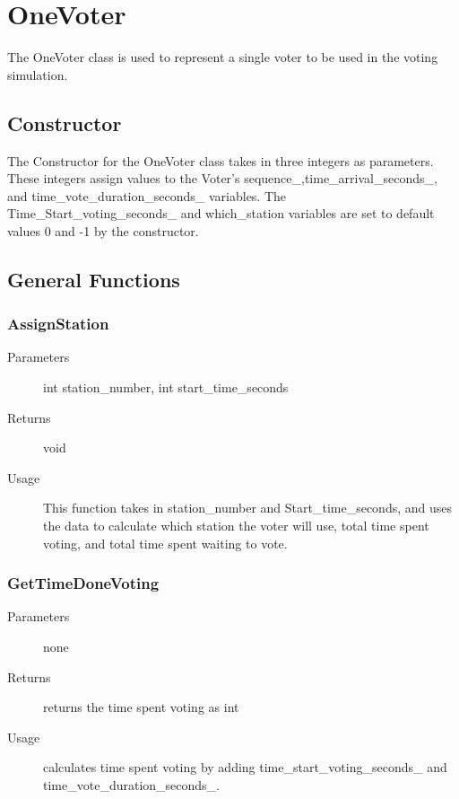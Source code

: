 %

\chapter{OneVoter}
The OneVoter class is used to represent a single voter to be used in the voting simulation.  

\section{Constructor}
The Constructor for the OneVoter class takes in three integers as parameters.  These integers assign values to the Voter's sequence\_,time\_arrival\_seconds\_, and time\_vote\_duration\_seconds\_ variables.  The Time\_Start\_voting\_seconds\_ and which\_station variables are set to default values 0 and -1 by the constructor.

\section{General Functions}

\subsection{AssignStation}
\begin{description}
\item[Parameters] int station\_number, int start\_time\_seconds
\item[Returns] void
\item[Usage] This function takes in station\_number and Start\_time\_seconds, and uses the data to calculate which station the voter will use, total time spent voting, and total time spent waiting to vote.
\end{description}

\subsection{GetTimeDoneVoting}
\begin{description}
\item[Parameters] none
\item[Returns] returns the time spent voting as int
\item[Usage] calculates time spent voting by adding time\_start\_voting\_seconds\_ and time\_vote\_duration\_seconds\_.
\end{description}

